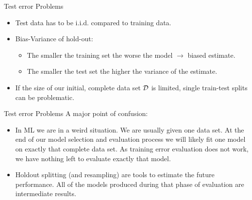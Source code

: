 \documentclass[11pt,compress,t,notes=noshow, xcolor=table]{beamer}
\begin{document}
\begin{vbframe}{Test error Problems}
\begin{itemize}
  \item Test data has to be i.i.d. compared to training data.
  \item Bias-Variance of hold-out:\\
  \begin{itemize}
    \item The smaller the training set the worse the model $\rightarrow$ biased estimate.\\
    \item The smaller the test set the higher the variance of the estimate.
  \end{itemize}   
  \item If the size of our initial, complete data set $\mathcal{D}$ is limited,
  single train-test splits can be problematic.
\end{itemize}
\end{vbframe}

\begin{vbframe}{Test error Problems}
A major point of confusion:
\begin{itemize}
\item In ML we are in a weird situation. We are usually given one data set. At the end of our model selection and evaluation process
we will likely fit one model on exactly that complete data set. As training error evaluation does not work,
we have nothing left to evaluate exactly that model.
\item Holdout splitting (and resampling) are tools to estimate the future
performance. All of the models produced during that phase of evaluation are intermediate results.
\end{itemize}
\end{vbframe}



% 
% 
% 
% 
% 
\end{document}
